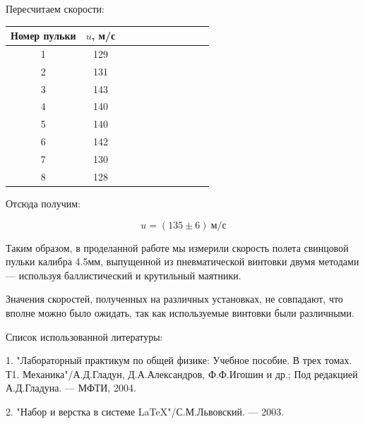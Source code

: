 \documentclass[14pt]{article}
\begin{document}
Пересчитаем скорости:
\begin{center}
\begin{tabular}{|c|c|c|c|c|c|c|c|c|c|c|}
\hline
Номер пульки	&	$u$, м/с			\\
\hline
1				&	129					\\
\hline
2				&	131					\\
\hline
3				&	143					\\
\hline
4				&	140					\\
\hline
5				&	140					\\
\hline
6				&	142					\\
\hline
7				&	130					\\
\hline
8				&	128					\\
\hline
\end{tabular}
\end{center}

Отсюда получим:

$$
	u = (135 \pm 6)~\text{м/с}
$$

\newpage
Таким образом, в проделанной работе мы измерили скорость полета свинцовой пульки калибра 4.5мм, выпущенной из пневматической винтовки двумя методами --- используя баллистический и крутильный маятники. 

Значения скоростей, полученных на различных установках, не совпадают, что вполне можно было ожидать, так как используемые винтовки были различными.

\newpage
Список использованной литературы:
	
\vspace{0.5cm}
1. "Лабораторный практикум по общей физике: Учебное пособие. В трех томах. Т1. Механика"/А.Д.Гладун, Д.А.Александров,
Ф.Ф.Игошин и др.; Под редакцией А.Д.Гладуна. --- МФТИ, 2004.

2. "Набор и верстка в системе \LaTeX "/С.М.Львовский. --- 2003.
\end{document}
